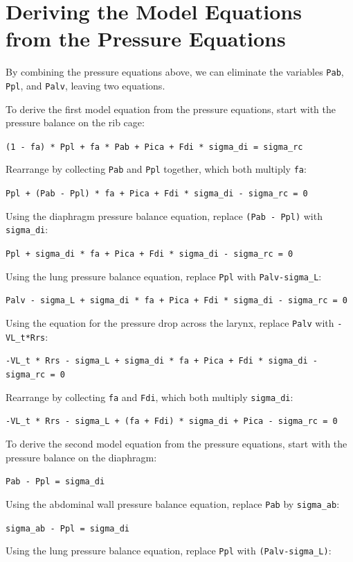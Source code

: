 \documentclass[12pt,openany,oneside]{book}
\newcommand{\ticode}[1]{\texttt{#1}}
\begin{document}
\section{Deriving the Model Equations from the Pressure Equations}

By combining the pressure equations above, we can eliminate the
variables \ticode{Pab}, \ticode{Ppl}, and \ticode{Palv}, leaving two
equations.

To derive the first model equation from the pressure equations, start
with the pressure balance on the rib cage:

\ticode{(1 - fa) * Ppl + fa * Pab + Pica + Fdi * sigma\_di = sigma\_rc}

Rearrange by collecting \ticode{Pab} and \ticode{Ppl} together, which
both multiply \ticode{fa}:

\ticode{Ppl + (Pab - Ppl) * fa + Pica + Fdi * sigma\_di - sigma\_rc = 0}

Using the diaphragm pressure balance equation, replace \ticode{(Pab -
  Ppl)} with \ticode{sigma\_di}:

\ticode{Ppl + sigma\_di * fa + Pica + Fdi * sigma\_di - sigma\_rc = 0}

Using the lung pressure balance equation, replace \ticode{Ppl} with
\ticode{Palv-sigma\_L}:

\ticode{Palv - sigma\_L + sigma\_di * fa + Pica + Fdi * sigma\_di - sigma\_rc = 0}

Using the equation for the pressure drop across the larynx, replace
\ticode{Palv} with \ticode{-VL\_t*Rrs}:

\ticode{-VL\_t * Rrs - sigma\_L + sigma\_di * fa + Pica + Fdi * sigma\_di - sigma\_rc = 0}

Rearrange by collecting \ticode{fa} and \ticode{Fdi}, which both
multiply \ticode{sigma\_di}:

\ticode{-VL\_t * Rrs - sigma\_L + (fa + Fdi) * sigma\_di + Pica - sigma\_rc = 0}


To derive the second model equation from the pressure equations, start
with the pressure balance on the diaphragm:

\ticode{Pab - Ppl = sigma\_di}

Using the abdominal wall pressure balance equation, replace
\ticode{Pab} by \ticode{sigma\_ab}:

\ticode{sigma\_ab - Ppl = sigma\_di}

Using the lung pressure balance equation, replace \ticode{Ppl} with
\ticode{(Palv-sigma\_L)}:
\end{document}
